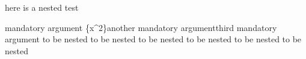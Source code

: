 here is a nested test
\begin{one}{mandatory argument} {\{x^2\}another mandatory argument}{third mandatory argument}
	to be nested to be nested
	to be nested to be nested
	to be nested to be nested
\end{one}
